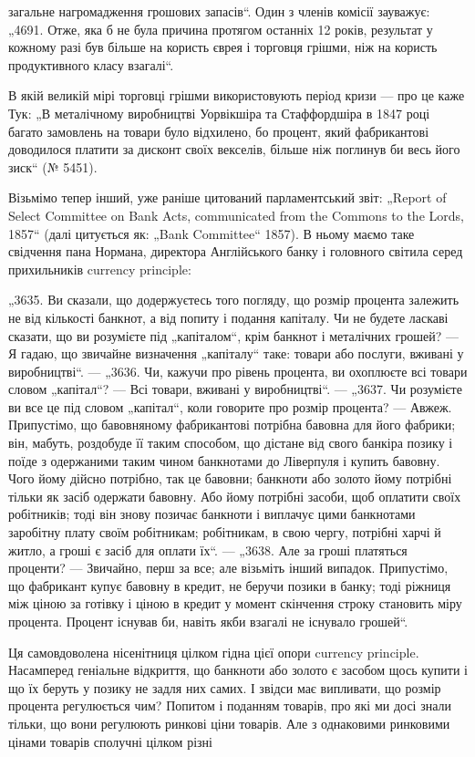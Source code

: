 \parcont{}  %
загальне нагромадження грошових запасів“. Один з членів комісії
зауважує: „4691. Отже, яка б не була причина протягом
останніх 12 років, результат у кожному разі був більше на користь єврея і торговця грішми, ніж на
користь продуктивного
класу взагалі“.

В якій великій мірі торговці грішми використовують період
кризи — про це каже Тук: „В металічному виробництві Уорвікшіра та Стаффордшіра в 1847 році багато
замовлень на товари
було відхилено, бо процент, який фабрикантові доводилося платити за дисконт своїх векселів, більше
ніж поглинув би весь
його зиск“ (№ 5451).

Візьмімо тепер інший, уже раніше цитований парламентський
звіт: „Report of Select Committee on Bank Acts, communicated from
the Commons to the Lords, 1857“ (далі цитується як: „Bank Committee“ 1857). В ньому маємо таке
свідчення пана Нормана, директора Англійського банку і головного світила серед прихильників currency
principle:

„3635. Ви сказали, що додержуєтесь того погляду, що розмір
процента залежить не від кількості банкнот, а від попиту і подання капіталу. Чи не будете ласкаві
сказати, що ви розумієте під
„капіталом“, крім банкнот і металічних грошей? — Я гадаю, що звичайне визначення „капіталу“ таке:
товари або послуги, вживані
у виробництві“. — „3636. Чи, кажучи про рівень процента, ви
охоплюєте всі товари словом „капітал“? — Всі товари, вживані
у виробництві“. — „3637. Чи розумієте ви все це під словом
„капітал“, коли говорите про розмір процента? — Авжеж. Припустімо, що бавовняному фабрикантові
потрібна бавовна для його
фабрики; він, мабуть, роздобуде її таким способом, що дістане
від свого банкіра позику і поїде з одержаними таким чином
банкнотами до Ліверпуля і купить бавовну. Чого йому дійсно
потрібно, так це бавовни; банкноти або золото йому потрібні
тільки як засіб одержати бавовну. Або йому потрібні засоби,
щоб оплатити своїх робітників; тоді він знову позичає банкноти
і виплачує цими банкнотами заробітну плату своїм робітникам;
робітникам, в свою чергу, потрібні харчі й житло, а гроші є
засіб для оплати їх“. — „3638. Але за гроші платяться проценти? — Звичайно, перш за все; але
візьміть інший випадок. Припустімо, що фабрикант купує бавовну в кредит, не беручи позики
в банку; тоді ріжниця між ціною за готівку і ціною в кредит
у момент скінчення строку становить міру процента. Процент
існував би, навіть якби взагалі не існувало грошей“.

Ця самовдоволена нісенітниця цілком гідна цієї опори currency principle. Насамперед геніальне
відкриття, що банкноти
або золото є засобом щось купити і що їх беруть у позику не
задля них самих. І звідси має випливати, що розмір процента
регулюється чим? Попитом і поданням товарів, про які ми досі
знали тільки, що вони регулюють ринкові ціни товарів. Але
з однаковими ринковими цінами товарів сполучні цілком різні
\parbreak{}  %
